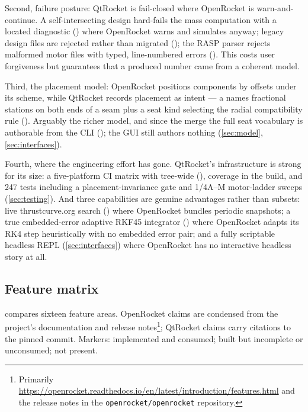 Second, failure posture: QtRocket is fail-closed where OpenRocket is warn-and-continue. A
self-intersecting design hard-fails the mass computation with a located diagnostic
() where OpenRocket warns and simulates anyway; legacy design
files are rejected rather than migrated (); the RASP parser
rejects malformed motor files with typed, line-numbered errors ().
This costs user forgiveness but guarantees that a produced number came from a coherent model.

Third, the placement model: OpenRocket positions components by offsets under its
 scheme, while QtRocket records placement as intent --- a 
names fractional stations on both ends of a seam plus a seat kind selecting the radial
compatibility rule (). Arguably the richer model, and since the
 merge the full seat vocabulary is authorable from the CLI
(); the GUI still authors nothing (\cref{sec:model},
\cref{sec:interfaces}).

Fourth, where the engineering effort has gone. QtRocket's infrastructure is strong for its size:
a five-platform CI matrix with  tree-wide
(),  coverage in the build,
and 247 tests including a placement-invariance gate and 1/4A--M motor-ladder sweeps
(\cref{sec:testing}). And three capabilities are genuine advantages rather than subsets: live
thrustcurve.org search () where OpenRocket bundles periodic
snapshots; a true embedded-error adaptive RKF45 integrator () where
OpenRocket adapts its RK4 step heuristically with no embedded error pair; and a fully scriptable
headless REPL (\cref{sec:interfaces}) where OpenRocket has no interactive headless story at all.

\subsection{Feature matrix}\label{sec:comparison-matrix}

 compares sixteen feature areas. OpenRocket claims are condensed
from the project's documentation and release notes\footnote{Primarily
\url{https://openrocket.readthedocs.io/en/latest/introduction/features.html} and the release
notes in the \texttt{openrocket/openrocket} repository.}; QtRocket claims carry citations to the
pinned commit. Markers: \fpresent{} implemented and consumed; \fpartial{} built but incomplete
or unconsumed; \fabsent{} not present.

